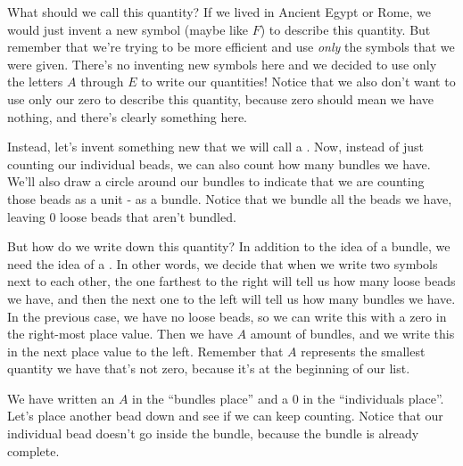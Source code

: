 \documentclass{ximera}
\begin{document}
What should we call this quantity? If we lived in Ancient Egypt or Rome, we would just invent a new symbol (maybe like $F$) to describe this quantity. But remember that we're trying to be more efficient and use {\em only} the symbols that we were given. There's no inventing new symbols here and we decided to use only the letters $A$ through $E$ to write our quantities! Notice that we also don't want to use only our zero to describe this quantity, because zero should mean we have nothing, and there's clearly something here.

Instead, let's invent something new that we will call a . Now, instead of just counting our individual beads, we can also count how many bundles we have. We'll also draw a circle around our bundles to indicate that we are counting those beads as a unit - as a bundle. Notice that we bundle all the beads we have, leaving $0$ loose beads that aren't bundled.

\begin{image}
\end{image}

But how do we write down this quantity? In addition to the idea of a bundle, we need the idea of a . In other words, we decide that when we write two symbols next to each other, the one farthest to the right will tell us how many loose beads we have, and then the next one to the left will tell us how many bundles we have. In the previous case, we have no loose beads, so we can write this with a zero in the right-most place value. Then we have $A$ amount of bundles, and we write this in the next place value to the left. Remember that $A$ represents the smallest quantity we have that's not zero, because it's at the beginning of our list.

\begin{image}
\end{image}

We have written an $A$ in the ``bundles place'' and a $0$ in the ``individuals place''. Let's place another bead down and see if we can keep counting. Notice that our individual bead doesn't go inside the bundle, because the bundle is already complete.
\end{document}
